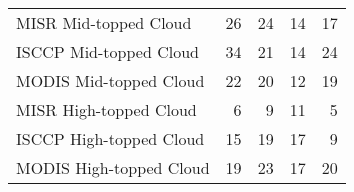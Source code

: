 \begin{tabular}{lrrrr}
   MISR Mid-topped Cloud &                       26 &                       24 &                       14 &                       17 \\
  ISCCP Mid-topped Cloud &                       34 &                       21 &                       14 &                       24 \\
  MODIS Mid-topped Cloud &                       22 &                       20 &                       12 &                       19 \\
  MISR High-topped Cloud &                        6 &                        9 &                       11 &                        5 \\
 ISCCP High-topped Cloud &                       15 &                       19 &                       17 &                        9 \\
 MODIS High-topped Cloud &                       19 &                       23 &                       17 &                       20 \\ \hline
\end{tabular}
